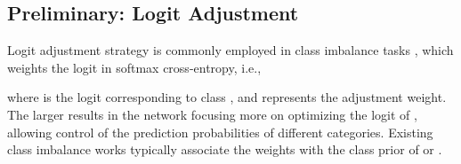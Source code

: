 \documentclass{article}
\begin{document}
	\subsection{Preliminary: Logit Adjustment }
	
	Logit adjustment strategy is commonly employed in class imbalance tasks \cite{lin2017focal,menon2020long}, which weights the logit in softmax cross-entropy, i.e., 
	
	where  is the logit corresponding to class , and  represents the adjustment weight. The larger  results in the network focusing more on optimizing the logit of , allowing control of the prediction probabilities of different categories. Existing class imbalance works typically associate the weights with the class prior of  or  \cite{cao2019learning,tan2020equalization,menon2020long}.
	
\end{document}
